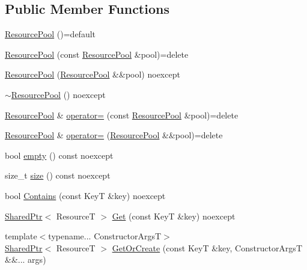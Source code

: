 \subsection*{Public Member Functions}
\begin{DoxyCompactItemize}
\item 
\hyperlink{classmage_1_1_resource_pool_a94aff142869744ed48fb1b426face48b}{Resource\+Pool} ()=default
\item 
\hyperlink{classmage_1_1_resource_pool_ad1cc0cf98317e65900879b85625f10ac}{Resource\+Pool} (const \hyperlink{classmage_1_1_resource_pool}{Resource\+Pool} \&pool)=delete
\item 
\hyperlink{classmage_1_1_resource_pool_add752b5c5f2244cbc8f24ee0755dafcb}{Resource\+Pool} (\hyperlink{classmage_1_1_resource_pool}{Resource\+Pool} \&\&pool) noexcept
\item 
\hyperlink{classmage_1_1_resource_pool_ad5dceb2a1cbd47ced5cb6ad269f4510e}{$\sim$\+Resource\+Pool} () noexcept
\item 
\hyperlink{classmage_1_1_resource_pool}{Resource\+Pool} \& \hyperlink{classmage_1_1_resource_pool_accb458f018c38fc154fd3931e0129ad6}{operator=} (const \hyperlink{classmage_1_1_resource_pool}{Resource\+Pool} \&pool)=delete
\item 
\hyperlink{classmage_1_1_resource_pool}{Resource\+Pool} \& \hyperlink{classmage_1_1_resource_pool_a75dbf08b971929eb90d32b38faa3cfb1}{operator=} (\hyperlink{classmage_1_1_resource_pool}{Resource\+Pool} \&\&pool)=delete
\item 
bool \hyperlink{classmage_1_1_resource_pool_aa406e4382ec7047c5576d039d7adc424}{empty} () const noexcept
\item 
size\+\_\+t \hyperlink{classmage_1_1_resource_pool_ab032684a1ed5a782a61f663e269a994a}{size} () const noexcept
\item 
bool \hyperlink{classmage_1_1_resource_pool_a36665c107134816d3e72322e9c80bebd}{Contains} (const KeyT \&key) noexcept
\item 
\hyperlink{namespacemage_a1e01ae66713838a7a67d30e44c67703e}{Shared\+Ptr}$<$ ResourceT $>$ \hyperlink{classmage_1_1_resource_pool_abdd0bc69948404b0185ef7c417e95ff9}{Get} (const KeyT \&key) noexcept
\item 
{\footnotesize template$<$typename... Constructor\+ArgsT$>$ }\\\hyperlink{namespacemage_a1e01ae66713838a7a67d30e44c67703e}{Shared\+Ptr}$<$ ResourceT $>$ \hyperlink{classmage_1_1_resource_pool_ab66c25c99198874eeae3ea54a5942c75}{Get\+Or\+Create} (const KeyT \&key, Constructor\+ArgsT \&\&... args)

\end{DoxyCompactItemize}
